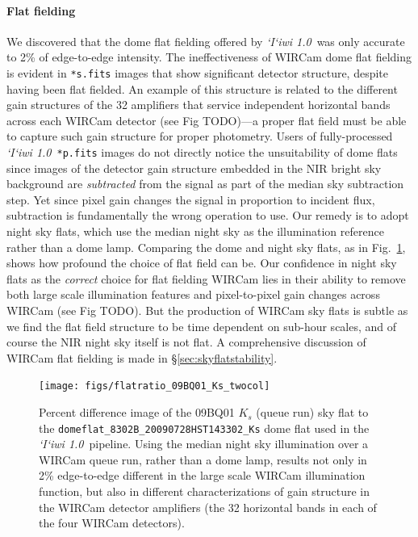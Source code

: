 \documentclass[iop]{emulateapj}
\newcommand{\sw}[1]{\textit{#1}} %
\newcommand{\iiwione}{\sw{`I`iwi 1.0}}
\newcommand{\todo}[1]{\textcolor{BurntOrange}{\textsf{#1}}} %
\newcommand{\Fig}[1]{Fig.~\ref{fig:#1}}  %
\newcommand{\Sec}[1]{\S\ref{sec:#1}}  %
\begin{document}
\paragraph{Flat fielding} We discovered that the dome flat fielding offered by \iiwione\ was only accurate to 2\% of edge-to-edge intensity.
The ineffectiveness of WIRCam dome flat fielding is evident in \texttt{*s.fits} images that show significant detector structure, despite having been flat fielded.
An example of this structure is related to the different gain structures of the 32 amplifiers that service independent horizontal bands across each WIRCam detector (see Fig \todo{TODO})---a proper flat field must be able to capture such gain structure for proper photometry.
Users of fully-processed \iiwione\ \texttt{*p.fits} images do not directly notice the unsuitability of dome flats since images of the detector gain structure embedded in the NIR bright sky background are \textit{subtracted} from the signal as part of the median sky subtraction step.
Yet since pixel gain changes the signal in proportion to incident flux, subtraction is fundamentally the wrong operation to use.
Our remedy is to adopt night sky flats, which use the median night sky as the illumination reference rather than a dome lamp.
Comparing the dome and night sky flats, as in \Fig{domeflatratio}, shows how profound the choice of flat field can be.
Our confidence in night sky flats as the \textit{correct} choice for flat fielding WIRCam lies in their ability to remove both large scale illumination features and pixel-to-pixel gain changes across WIRCam (see Fig \todo{TODO}).
But the production of WIRCam sky flats is subtle as we find the flat field structure to be time dependent on sub-hour scales, and of course the NIR night sky itself is not flat.
A comprehensive discussion of WIRCam flat fielding is made in \Sec{skyflatstability}.

\begin{figure}[t]
   \centering
    \texttt{[image: figs/flatratio\_09BQ01\_Ks\_twocol]}
    \caption{Percent difference image of the 09BQ01 $K_s$ (queue run) sky flat to the \texttt{domeflat\_8302B\_20090728HST143302\_Ks} dome flat used in the \iiwione\ pipeline. Using the median night sky illumination over a WIRCam queue run, rather than a dome lamp, results not only in 2\% edge-to-edge different in the large scale WIRCam illumination function, but also in different characterizations of gain structure in the WIRCam detector amplifiers (the 32 horizontal bands in each of the four WIRCam detectors).}
   \label{fig:domeflatratio}
\end{figure}
\end{document}
